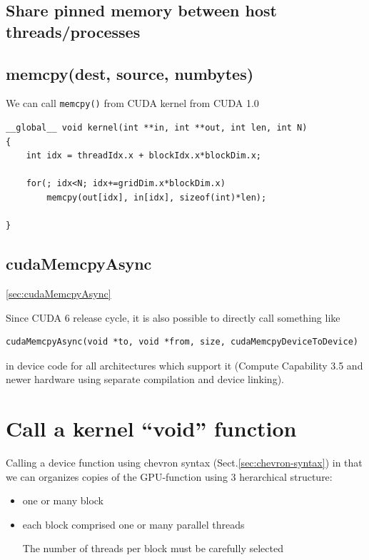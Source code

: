 \subsection{Share pinned memory between host threads/processes}
\label{sec:cudac_share_pinned_mem}

\subsection{memcpy(dest, source, numbytes)}

We can call \verb!memcpy()! from CUDA kernel from CUDA 1.0
\begin{lstlisting}
__global__ void kernel(int **in, int **out, int len, int N)
{
    int idx = threadIdx.x + blockIdx.x*blockDim.x;

    for(; idx<N; idx+=gridDim.x*blockDim.x)
        memcpy(out[idx], in[idx], sizeof(int)*len);

}
\end{lstlisting}

\subsection{cudaMemcpyAsync}
\ref{sec:cudaMemcpyAsync}

Since CUDA 6 release cycle, it is also possible to directly call something like
\begin{lstlisting}
cudaMemcpyAsync(void *to, void *from, size, cudaMemcpyDeviceToDevice)
\end{lstlisting}
in device code for all architectures which support it (Compute Capability 3.5
and newer hardware using separate compilation and device linking).


\section{Call a kernel ``void'' function}
\label{sec:ccuda_callkernel}

Calling a device function using chevron syntax (Sect.\ref{sec:chevron-syntax})
in that we can organizes copies of the GPU-function using 3 herarchical structure: 
\begin{itemize}
  \item one or many block
  
  \item each block comprised one or many parallel threads
  
The number of threads per block must be carefully selected
\end{itemize}

